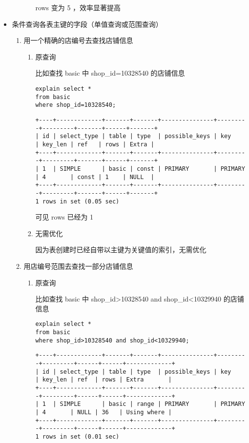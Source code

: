 \documentclass[11pt]{article}
\begin{document}
\begin{itemize}
\begin{enumerate}
\begin{enumerate}
rows 变为 5 ，效率显著提高
\end{enumerate}
\end{enumerate}
\item 条件查询各表主键的字段（单值查询或范围查询）
\label{sec-3-2-1-4}
\begin{enumerate}
\item 用一个精确的店编号去查找店铺信息
\begin{enumerate}
\item 原查询

比如查找 basic 中 shop\_id=10328540 的店铺信息

\begin{lstlisting}
explain select *
from basic
where shop_id=10328540;
\end{lstlisting}

\begin{verbatim}
+----+-------------+-------+-------+---------------+---------+---------+-------+------+-------+
| id | select_type | table | type  | possible_keys | key     | key_len | ref   | rows | Extra |
+----+-------------+-------+-------+---------------+---------+---------+-------+------+-------+
| 1  | SIMPLE      | basic | const | PRIMARY       | PRIMARY | 4       | const | 1    | NULL  |
+----+-------------+-------+-------+---------------+---------+---------+-------+------+-------+
1 rows in set (0.05 sec)
\end{verbatim}

可见 rows 已经为 1

\item 无需优化

因为表创建时已经自带以主键为关键值的索引，无需优化
\end{enumerate}
\item 用店编号范围去查找一部分店铺信息
\begin{enumerate}
\item 原查询

比如查找 basic 中 shop\_id>10328540 and shop\_id<10329940 的店铺信息

\begin{lstlisting}
explain select *
from basic
where shop_id>10328540 and shop_id<10329940;
\end{lstlisting}

\begin{verbatim}
+----+-------------+-------+-------+---------------+---------+---------+------+------+-------------+
| id | select_type | table | type  | possible_keys | key     | key_len | ref  | rows | Extra       |
+----+-------------+-------+-------+---------------+---------+---------+------+------+-------------+
| 1  | SIMPLE      | basic | range | PRIMARY       | PRIMARY | 4       | NULL | 36   | Using where |
+----+-------------+-------+-------+---------------+---------+---------+------+------+-------------+
1 rows in set (0.01 sec)
\end{verbatim}


\end{enumerate}
\end{enumerate}
\end{itemize}
\end{document}
